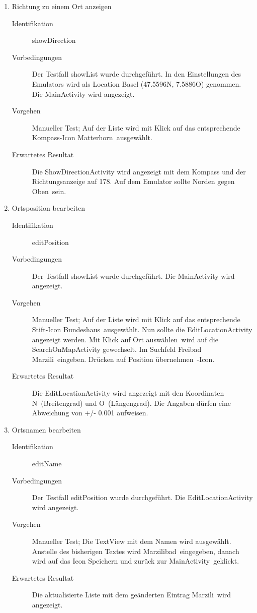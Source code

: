 \documentclass[12pt,a4paper]{scrartcl}
\begin{document}
\begin{enumerate}
  \item Richtung zu einem Ort anzeigen

  \begin{description}
    \item [Identifikation] showDirection
    \item [Vorbedingungen] Der Testfall showList wurde durchgeführt. In den Einstellungen des Emulators wird als Location Basel (47.5596N, 7.5886O) genommen. Die MainActivity wird angezeigt.
    \item [Vorgehen] Manueller Test; Auf der Liste wird mit Klick auf das entsprechende Kompass-Icon \dq Matterhorn\dq\ ausgewählt.
    \item [Erwartetes Resultat] Die ShowDirectionActivity wird angezeigt mit dem Kompass und der Richtungsanzeige auf 178\textdegree. Auf dem Emulator sollte Norden gegen \dq Oben\dq\ sein.
  \end{description}

  \item Ortsposition bearbeiten

  \begin{description}
    \item [Identifikation] editPosition
    \item [Vorbedingungen] Der Testfall showList wurde durchgeführt. Die MainActivity wird angezeigt.
    \item [Vorgehen] Manueller Test; Auf der Liste wird mit Klick auf das entsprechende Stift-Icon \dq Bundeshaus\dq\ ausgewählt. Nun sollte die EditLocationActivity angezeigt werden. Mit Klick auf \dq Ort auswählen\dq\ wird auf die SearchOnMapActivity gewechselt. Im Suchfeld \dq Freibad Marzili\dq\ eingeben. Drücken auf \dq Position übernehmen\dq\ -Icon.
    \item [Erwartetes Resultat] Die EditLocationActivity wird angezeigt mit den Koordinaten  N\dq\ (Breitengrad) und  O\dq\ (Längengrad). Die Angaben dürfen eine Abweichung von +/- 0.001 aufweisen.
  \end{description}

  \item Ortsnamen bearbeiten

  \begin{description}
  \item [Identifikation] editName
  \item [Vorbedingungen] Der Testfall editPosition wurde durchgeführt. Die EditLocationActivity wird angezeigt.
  \item [Vorgehen] Manueller Test; Die TextView mit dem Namen wird ausgewählt. Anstelle des bisherigen Textes wird \dq Marzilibad\dq\ eingegeben, danach wird auf das Icon \dq Speichern und zurück zur MainActivity\dq\ geklickt.
  \item [Erwartetes Resultat] Die aktualisierte Liste mit dem geänderten Eintrag \dq Marzili\dq\ wird angezeigt.
  \end{description}

\end{enumerate}
\end{document}
